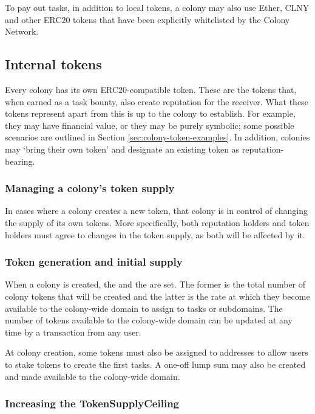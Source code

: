To pay out tasks, in addition to local tokens, a colony may also use Ether, CLNY and other ERC20 tokens that have been explicitly whitelisted by the Colony Network.

\subsection{Internal tokens}\label{sec:colony-tokens}

Every colony has its own ERC20-compatible token. These are the tokens that, when earned as a task bounty, also create reputation for the receiver. What these tokens represent apart from this is up to the colony to establish. For example, they may have financial value, or they may be purely symbolic; some possible scenarios are outlined in Section \ref{sec:colony-token-examples}. In addition, colonies may `bring their own token' and designate an existing token as reputation-bearing.

\subsubsection{Managing a colony's token supply}\label{sec:colony-token-management}

In cases where a colony creates a new token, that colony is in control of changing the supply of its own tokens. More specifically, both reputation holders and token holders must agree to changes in the token supply, as both will be affected by it.

\subsubsection*{Token generation and initial supply}

When a colony is created, the  and the  are set. The former is the total number of colony tokens that will be created and the latter is the rate at which they become available to the colony-wide domain to assign to tasks or subdomains. The number of tokens available to the colony-wide domain can be updated at any time by a transaction from any user.

At colony creation, some tokens must also be assigned to addresses to allow users to stake tokens to create the first tasks. A one-off lump sum may also be created and made available to the colony-wide domain.

\subsubsection*{Increasing the TokenSupplyCeiling}

